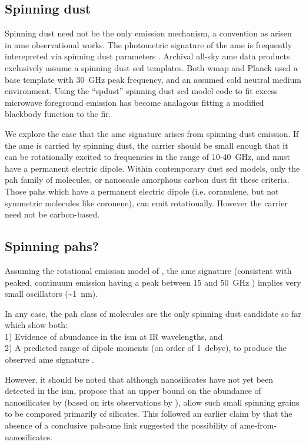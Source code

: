     \subsection{Spinning dust}
     Spinning dust need not be the only emission mechanism, a convention as arisen in \gls{ame} observational works. The photometric signature of the \gls{ame} is frequently interepreted via spinning dust parameters \citep{ysard11,ali-haimoud10}. Archival all-sky \gls{ame} data products exclusively assume a spinning dust \gls{sed} templates. Both \gls{wmap} and Planck used a base template with 30~GHz peak frequency, and an assumed cold neutral medium environment. Using the ``spdust'' spinning dust \gls{sed} model code to fit excess microwave foreground emission has become analagous fitting a modified blackbody function to the \gls{fir}.

      We explore the case that the \gls{ame} signature arises from spinning dust emission. If the \gls{ame} is carried by spinning dust, the carrier should be small enough that it can be rotationally excited to frequencies in the range of 10-40~GHz, and must have a permanent electric dipole. Within contemporary dust \gls{sed} models, only the \gls{pah} family of molecules, or nanoscale amorphous carbon dust fit these criteria. Those \gls{pah}s which have a permanent electric dipole (i.e. coranulene, but not symmetric molecules like coronene), can emit rotationally. However the carrier need not be carbon-based.

     \subsection{Spinning \gls{pah}s?}
       Assuming the rotational emission model of \cite{draine98b}, the \gls{ame} signature (consistent with peaked, continuum emission having a peak between 15 and 50~GHz ) implies very small oscillators (\textasciitilde{}1~nm).

       In any case, the \gls{pah} class of molecules are the only spinning dust candidate so far which show both: \\
       1) Evidence of abundance in the \gls{ism} at IR wavelengths, and \\
       2) A predicted range of dipole moments (on order of 1~debye), to produce the observed \gls{ame} signature \citep{draine98b, lovas05, thorwirth07}.

       However, it should be noted that although nanosilicates have not yet been detected in the \gls{ism}, \cite{hensley17a} propose that an upper bound on the abundance of nanosilicates by \cite{li01} (based on \gls{irts} observations by \cite{onaka96}), allow such small spinning grains to be composed primarily of silicates. This followed an earlier claim by \cite{hensley16} that the absence of a conclusive \gls{pah}-\gls{ame} link suggested the possibility of \gls{ame}-from-nanosilicates.

